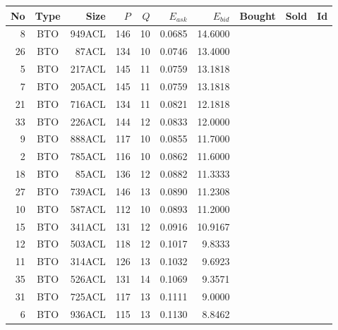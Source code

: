 \begin{tabular}{|r|c|r|r|r|r|r|p{2cm}|p{2cm}|r|}
\hline

No & Type & Size & $P$ & $Q$ & $E_{ask}$ & $E_{bid}$ & Bought & Sold & Id \\
\hline
8 & BTO & 949ACL & 146 & 10 & 0.0685 & 14.6000 &    &    &    \\
\hline
26 & BTO & 87ACL & 134 & 10 & 0.0746 & 13.4000 &    &    &    \\
\hline
5 & BTO & 217ACL & 145 & 11 & 0.0759 & 13.1818 &    &    &    \\
\hline
7 & BTO & 205ACL & 145 & 11 & 0.0759 & 13.1818 &    &    &    \\
\hline
21 & BTO & 716ACL & 134 & 11 & 0.0821 & 12.1818 &    &    &    \\
\hline
33 & BTO & 226ACL & 144 & 12 & 0.0833 & 12.0000 &    &    &    \\
\hline
9 & BTO & 888ACL & 117 & 10 & 0.0855 & 11.7000 &    &    &    \\
\hline
2 & BTO & 785ACL & 116 & 10 & 0.0862 & 11.6000 &    &    &    \\
\hline
18 & BTO & 85ACL & 136 & 12 & 0.0882 & 11.3333 &    &    &    \\
\hline
27 & BTO & 739ACL & 146 & 13 & 0.0890 & 11.2308 &    &    &    \\
\hline
10 & BTO & 587ACL & 112 & 10 & 0.0893 & 11.2000 &    &    &    \\
\hline
15 & BTO & 341ACL & 131 & 12 & 0.0916 & 10.9167 &    &    &    \\
\hline
12 & BTO & 503ACL & 118 & 12 & 0.1017 & 9.8333 &    &    &    \\
\hline
11 & BTO & 314ACL & 126 & 13 & 0.1032 & 9.6923 &    &    &    \\
\hline
35 & BTO & 526ACL & 131 & 14 & 0.1069 & 9.3571 &    &    &    \\
\hline
31 & BTO & 725ACL & 117 & 13 & 0.1111 & 9.0000 &    &    &    \\
\hline
6 & BTO & 936ACL & 115 & 13 & 0.1130 & 8.8462 &    &    &    \\
\hline
\end{tabular}
